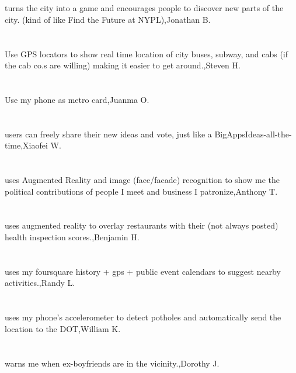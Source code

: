 \section{}turns the city into a game and encourages people to discover new parts of the city. (kind of like Find the Future at NYPL),Jonathan B.
\section{}Use GPS locators to show real time location of city buses, subway, and cabs (if the cab co.s are willing) making it easier to get around.,Steven H.
\section{} Use my phone as metro card,Juanma O.
\section{}users can freely share their new ideas and vote, just like a BigAppsIdeas-all-the-time,Xiaofei W.	
\section{}uses Augmented Reality and image (face/facade) recognition to show me the political contributions of people I meet and business I patronize,Anthony T.	
\section{}uses augmented reality to overlay restaurants with their (not always posted) health inspection scores.,Benjamin H.	
\section{}uses my foursquare history + gps + public event calendars to suggest nearby activities.,Randy L.	
\section{}uses my phone's accelerometer to detect potholes and automatically send the location to the DOT,William K.	
\section{}warns me when ex-boyfriends are in the vicinity.,Dorothy J.	
